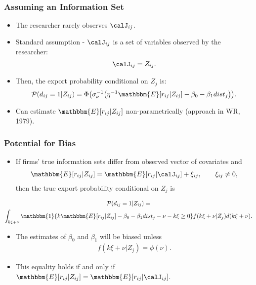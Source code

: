 \begin{frame}
\frametitle{Assuming an Information Set}

\begin{itemize}
	\item The researcher rarely observes $\calJ_{ij}$.
	\item Standard assumption - $\calJ_{ij}$ is a set of variables observed by the researcher:
	\begin{align*}
	\calJ_{ij}=Z_{ij}.
	\end{align*}
	\item Then, the export probability conditional on $Z_{j}$ is:
	\begin{align*}
	\mathcal{P}(d_{ij}=1|Z_{ij})=\Phi\big(\sigma_{\nu}^{-1}\big(\eta^{-1}\mathbbm{E}[r_{ij}|Z_{ij}]-\beta_{0}-\beta_{1}dist_{j}\big)\big).
	\end{align*}
	\item Can estimate $\mathbbm{E}[r_{ij}|Z_{ij}]$ non-parametrically (approach in WR, 1979).
\end{itemize}
\end{frame}
\begin{frame}[label=info_sets]
\frametitle{Potential for Bias}

\begin{itemize}
	\item If firms' true information sets differ from observed vector of covariates and
	\begin{align*}
	\mathbbm{E}[r_{ij}|Z_{ij}]=\mathbbm{E}[r_{ij}|\calJ_{ij}]+\xi_{ij},\qquad\xi_{ij}\neq0,
	\end{align*}
	then the true export probability conditional on $Z_{j}$ is 
\end{itemize}	
	\begin{gather*}
	\mathcal{P}(d_{ij}=1|Z_{ij})=\\
	\int_{k\xi+\nu}\mathbbm{1}\{k\mathbbm{E}[r_{ij}|Z_{ij}]-\beta_{0}-\beta_{1}dist_{j}-\nu-k\xi\geq 0\}f(k\xi+\nu|Z_{j})d(k\xi+\nu).
	\end{gather*}
\begin{itemize}
	\item The estimates of $\beta_{0}$ and $\beta_{1}$ will be biased unless 
	\begin{align*}
	f(k\xi+\nu|Z_{j})=\phi(\nu).
	\end{align*}
	\item This equality holds if and only if $\mathbbm{E}[r_{ij}|Z_{ij}]=\mathbbm{E}[r_{ij}|\calJ_{ij}]$.
\end{itemize}
\end{frame}

